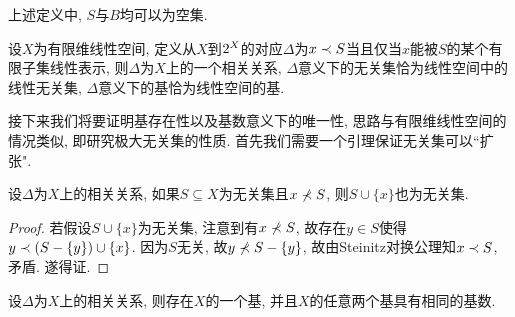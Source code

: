 \begin{remark}
  上述定义中, $S$与$B$均可以为空集.
\end{remark}

\begin{example}
  设$X$为有限维线性空间, 定义从$X$到$2^{X}$的对应$\Delta$为$x\prec S$当且仅当$x$能被$S$的某个有限子集线性表示, 则$\Delta$为$X$上的一个相关关系, $\Delta$意义下的无关集恰为线性空间中的线性无关集, $\Delta$意义下的基恰为线性空间的基.
\end{example}

接下来我们将要证明基存在性以及基数意义下的唯一性, 思路与有限维线性空间的情况类似, 即研究极大无关集的性质. 首先我们需要一个引理保证无关集可以``扩张".

\begin{proposition}\label{prop:dependlemma}
  设$\Delta$为$X$上的相关关系, 如果$S\subseteq X$为无关集且$x\nprec S$, 则$S\cup\{x\}$也为无关集.
\end{proposition}

\begin{proof}
  若假设$S\cup\{x\}$为无关集, 注意到有$x\nprec S$, 故存在$y\in S$使得$y\prec (S-\{y\})\cup \{x\}$. 因为$S$无关, 故$y\nprec S-\{y\}$, 故由Steinitz对换公理知$x\prec S$, 矛盾. 遂得证.
\end{proof}

\begin{theorem}\label{thm:dependbase}
  设$\Delta$为$X$上的相关关系, 则存在$X$的一个基, 并且$X$的任意两个基具有相同的基数.
\end{theorem}

